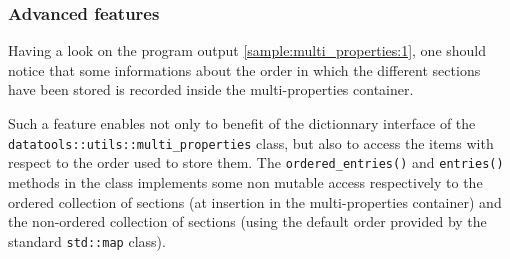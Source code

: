 \subsubsection{Advanced features}


\pn Having a look on the program output \ref{sample:multi_properties:1}, one
should notice that some informations about the order in which the different
sections have been stored is recorded inside the multi-properties container.

\pn  Such a feature  enables not  only to  benefit of  the dictionnary
interface   of  the   \\  \texttt{datatools::utils::multi\_properties}
class, but also to access the  items with respect to the order used to
store  them.  The  \texttt{ordered\_entries()}  and \texttt{entries()}
methods in  the class implements some non  mutable access respectively
to  the   ordered  collection  of   sections  (at  insertion   in  the
multi-properties container) and the non-ordered collection of sections
(using the  default order  provided by the  standard \texttt{std::map}
class).




